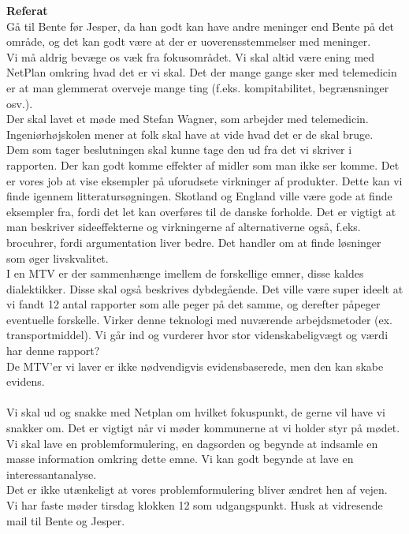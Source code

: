 \textbf{Referat} 
\\
Gå til Bente før Jesper, da han godt kan have andre meninger end Bente på det område, og det kan godt være at der er uoverensstemmelser med meninger.\\
Vi må aldrig bevæge os væk fra fokusområdet. Vi skal altid være ening med NetPlan omkring hvad det er vi skal. Det der mange gange sker med telemedicin er at man glemmerat overveje mange ting (f.eks. kompitabilitet, begrænsninger osv.). \\
Der skal lavet et møde med Stefan Wagner, som arbejder med telemedicin. Ingeniørhøjskolen mener at folk skal have at vide hvad det er de skal bruge. \\
Dem som tager beslutningen skal kunne tage den ud fra det vi skriver i rapporten. Der kan godt komme effekter af midler som man ikke ser komme. Det er vores job at vise eksempler på uforudsete virkninger af produkter. Dette kan vi finde igennem litteratursøgningen. Skotland og England ville være gode at finde eksempler fra, fordi det let kan overføres til de danske forholde. Det er vigtigt at man beskriver sideeffekterne og virkningerne af alternativerne også, f.eks. brocuhrer, fordi argumentation liver bedre. Det handler om at finde løsninger som øger livskvalitet. \\
I en MTV er der sammenhænge imellem de forskellige emner, disse kaldes dialektikker. Disse skal også beskrives dybdegående. Det ville være super ideelt at vi fandt 12 antal rapporter som alle peger på det samme, og derefter påpeger eventuelle forskelle. Virker denne teknologi med nuværende arbejdsmetoder (ex. transportmiddel). Vi går ind og vurderer hvor stor videnskabeligvægt og værdi har denne rapport? \\
De MTV'er vi laver er ikke nødvendigvis evidensbaserede, men den kan skabe evidens.\\
\\Vi skal ud og snakke med Netplan om hvilket fokuspunkt, de gerne vil have vi snakker om. Det er vigtigt når vi møder kommunerne at vi holder styr på mødet. Vi skal lave en problemformulering, en dagsorden og begynde at indsamle en masse information omkring dette emne. Vi kan godt begynde at lave en interessantanalyse.\\
Det er ikke utænkeligt at vores problemformulering bliver ændret hen af vejen.\\
Vi har faste møder tirsdag klokken 12 som udgangspunkt. Husk at vidresende mail til Bente og Jesper.\\

